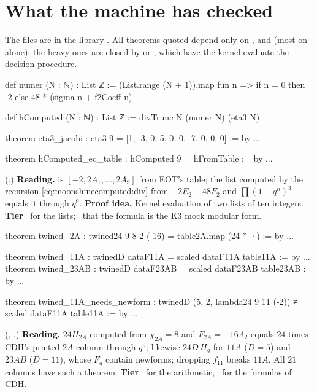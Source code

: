 \section{What the machine has checked}\label{sec:moonshinecomputed:lean}

The files are in the library . All theorems quoted depend only on
,  and  (most on 
alone); the heavy ones are closed by  or , which have the
kernel evaluate the decision procedure.

\begin{leanbox}
\begin{leancode}
def numer (N : ℕ) : List ℤ :=
  (List.range (N + 1)).map fun n => if n = 0 then -2 else 48 * (sigma n + f2Coeff n)

def hComputed (N : ℕ) : List ℤ := divTrunc N (numer N) (eta3 N)

theorem eta3_jacobi : eta3 9 = [1, -3, 0, 5, 0, 0, -7, 0, 0, 0] := by ...

theorem hComputed_eq_table : hComputed 9 = hFromTable := by ...
\end{leancode}
(.) \textbf{Reading.}  is
$[-2,2A_1,\dots,2A_9]$ from EOT's table; the list computed by the recursion
\eqref{eq:moonshinecomputed:div} from $-2E_2+48F_2$ and $\prod(1-q^n)^3$ equals it through
$q^9$. \textbf{Proof idea.} Kernel evaluation of two lists of ten integers.
\textbf{Tier} \TA\ for the lists; \TL\ that the formula is the K3 mock modular form.
\end{leanbox}

\begin{leanbox}
\begin{leancode}
theorem twined_2A : twined24 9 8 2 (-16) = table2A.map (24 * ·) := by ...

theorem twined_11A : twinedD dataF11A = scaled dataF11A table11A := by ...
theorem twined_23AB : twinedD dataF23AB = scaled dataF23AB table23AB := by ...

theorem twined_11A_needs_newform :
    twinedD (5, 2, lambda24 9 11 (-2)) ≠ scaled dataF11A table11A := by ...
\end{leancode}
(, .) \textbf{Reading.}
$24H_{2A}$ computed from $\chi_{2A}=8$ and $F_{2A}=-16\Lambda_2$ equals $24$ times CDH's
printed $2A$ column through $q^9$; likewise $24D\,H_g$ for $11A$ ($D=5$) and $23AB$
($D=11$), whose $F_g$ contain newforms; dropping $f_{11}$ breaks $11A$. All $21$ columns have
such a theorem. \textbf{Tier} \TA\ for the arithmetic, \TL\ for the formulas of CDH.
\end{leanbox}

